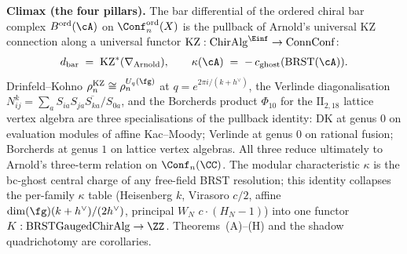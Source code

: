 \medskip\noindent\textbf{Climax (the four pillars).}
The bar differential of the ordered chiral bar complex
$B^{\mathrm{ord}}(\cA)$ on $\Conf_n^{\mathrm{ord}}(X)$ is the
pullback of Arnold's universal KZ connection along a universal
functor $\mathrm{KZ} : \mathrm{ChirAlg}^{\Einf} \to \mathrm{ConnConf}$:
\begin{equation*}
  d_{\mathrm{bar}} \;=\; \mathrm{KZ}^{*}(\nabla_{\mathrm{Arnold}}),
  \qquad
  \kappa(\cA) \;=\; -\,c_{\mathrm{ghost}}(\mathrm{BRST}(\cA)).
\end{equation*}
Drinfeld--Kohno
$\rho_{n}^{\mathrm{KZ}} \cong \rho_{n}^{U_{q}(\fg)}$
at $q = e^{2\pi i / (k + h^{\vee})}$, the Verlinde diagonalisation
$N_{ij}^{k} = \sum_{a} S_{ia}S_{ja}\overline{S_{ka}}/S_{0a}$, and the
Borcherds product $\Phi_{10}$ for the $\mathrm{II}_{2,18}$ lattice
vertex algebra are three specialisations of the pullback identity:
DK at genus $0$ on evaluation modules of affine Kac--Moody;
Verlinde at genus $0$ on rational fusion;
Borcherds at genus $1$ on lattice vertex algebras.
All three reduce ultimately to Arnold's three-term relation on
$\Conf_{n}(\CC)$. The modular characteristic $\kappa$ is the
bc-ghost central charge of any free-field BRST resolution; this
identity collapses the per-family $\kappa$ table
(Heisenberg $k$, Virasoro $c/2$, affine
$\dim(\fg)(k+h^{\vee})/(2h^{\vee})$, principal $W_{N}$
$c\cdot(H_{N}-1)$) into one functor
$K : \mathrm{BRSTGaugedChirAlg} \to \ZZ$.
Theorems~(A)--(H) and the shadow quadrichotomy are corollaries.
